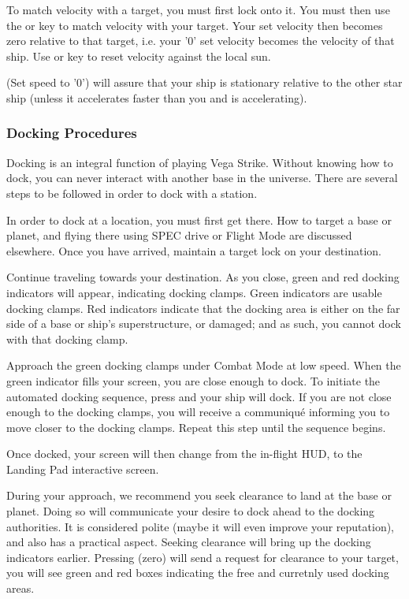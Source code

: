\documentclass{article}
\newcommand{\key}[1]{%
  \tikz[baseline=(key.base)]{
    \node[draw=gray!50, fill=gray!5, rounded corners=2pt, inner sep=2pt, minimum height=1.5ex] (key) {\footnotesize\sffamily\bfseries #1};
  }%
}
\begin{document}
To match velocity with a target, you must first lock onto it. You must then use the \key{HOME} or \key{KP-7} key to match velocity with your target. Your set velocity then becomes zero relative to that target, i.e. your '0' set velocity becomes the velocity of that ship. Use \key{END} or \key{KP-1} key to reset velocity against the local sun. 

\key{BACKSPACE} (Set speed to '0') will assure that your ship is stationary relative to the other star ship (unless it accelerates faster than you and is accelerating). 

\subsubsection{ Docking Procedures }

Docking is an integral function of playing Vega Strike. Without knowing how to dock, you can never interact with another base in the universe. There are several steps to be followed in order to dock with a station. 

In order to dock at a location, you must first get there. How to target a base or planet, and flying there using SPEC drive or Flight Mode are discussed elsewhere. Once you have arrived, maintain a target lock on your destination. 

Continue traveling towards your destination. As you close, green and red docking indicators will appear, indicating docking clamps. Green indicators are usable docking clamps. Red indicators indicate that the docking area is either on the far side of a base or ship's superstructure, or damaged; and as such, you cannot dock with that docking clamp. 

Approach the green docking clamps under Combat Mode at low speed. When the green indicator fills your screen, you are close enough to dock. To initiate the automated docking sequence, press \key{d} and your ship will dock. If you are not close enough to the docking clamps, you will receive a communiqué informing you to move closer to the docking clamps. Repeat this step until the sequence begins.  

Once docked, your screen will then change from the in-flight HUD, to the Landing Pad interactive screen. 

During your approach, we recommend you seek clearance to land at the base or planet. Doing so will communicate your desire to dock ahead to the docking authorities. It is considered polite (maybe it will even improve your reputation), and also has a practical aspect. Seeking clearance will bring up the docking indicators earlier. Pressing \key{0} (zero) will send a request for clearance to your target, you will see green and red boxes indicating the free and curretnly used docking areas. 
\end{document}
